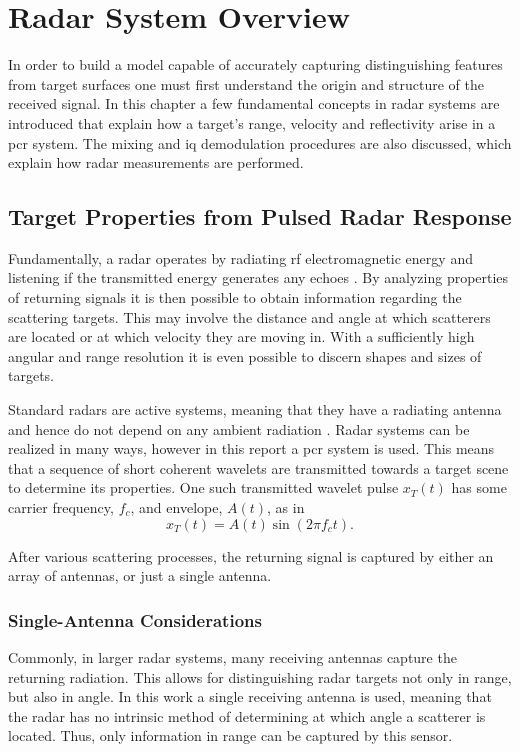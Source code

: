 \chapter{Radar System Overview}

In order to build a model capable of accurately capturing distinguishing features from target surfaces one must first understand the origin and structure of the received signal. In this chapter a few fundamental concepts in radar systems are introduced that explain how a target's range, velocity and reflectivity arise in a \gls{pcr} system. The mixing and \gls{iq} demodulation procedures are also discussed, which explain how radar measurements are performed.  

\section{Target Properties from Pulsed Radar Response}
Fundamentally, a radar operates by radiating \gls{rf} electromagnetic energy and listening if the transmitted energy generates any echoes \citep{skolnik_2009}. By analyzing properties of returning signals it is then possible to obtain information regarding the scattering targets. This may involve the distance and angle at which scatterers are located or at which velocity they are moving in. With a sufficiently high angular and range resolution it is even possible to discern shapes and sizes of targets.  

Standard radars are active systems, meaning that they have a radiating antenna and hence do not depend on any ambient radiation \citep{richards_2014}. Radar systems can be realized in many ways, however in this report a \gls{pcr} system is used. This means that a sequence of short coherent wavelets are transmitted towards a target scene to determine its properties. One such transmitted wavelet pulse $x_T(t)$ has some carrier frequency, $f_c$, and envelope, $A(t)$, as in
\begin{equation}\label{eq:trans}
	x_T(t)
	= A(t)\sin(2\pi f_c t).
\end{equation}

After various scattering processes, the returning signal is captured by either an array of antennas, or just a single antenna.

\subsection{Single-Antenna Considerations}

Commonly, in larger radar systems, many receiving antennas capture the returning radiation. This allows for distinguishing radar targets not only in range, but also in angle. In this work a single receiving antenna is used, meaning that the radar has no intrinsic method of determining at which angle a scatterer is located. Thus, only information in range can be captured by this sensor.

